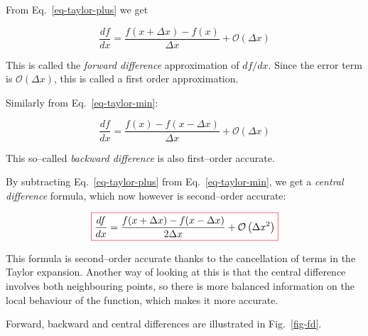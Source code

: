 From Eq.~\ref{eq-taylor-plus} we get

\begin{equation}
\frac{d f}{d x} = \frac{f(x+\Delta x) - f(x)}{\Delta x} + \mathcal{O}\left(\Delta x\right)
\end{equation} 

This is called the \emph{forward difference} approximation of $df / dx$. Since the error term is $\mathcal{O}(\Delta x)$, this is called a first order approximation.

Similarly from Eq.~\ref{eq-taylor-min}:

\begin{equation}
\frac{d f}{d x} = \frac{f(x) - f(x- \Delta x)}{\Delta x} + \mathcal{O}\left(\Delta x\right)
\end{equation} 

This so--called \emph{backward difference} is also first--order accurate.

By subtracting Eq.~\ref{eq-taylor-plus} from Eq.~\ref{eq-taylor-min}, we get a \emph{central difference} formula, which now however is second--order accurate:

\begin{equation}
\fbox{$\displaystyle
\frac{d f}{d x} = \frac{f(x + \Delta x) - f(x- \Delta x)}{2 \Delta x} + \mathcal{O}\left(\Delta x^2\right)
$}
\end{equation} 

This formula is second--order accurate thanks to the cancellation of terms in the Taylor expansion. Another way of looking at this is that the central difference involves both neighbouring points, so there is more balanced information on the local behaviour of the function, which makes it more accurate.

Forward, backward and central differences are illustrated in Fig.~\ref{fig-fd}.

